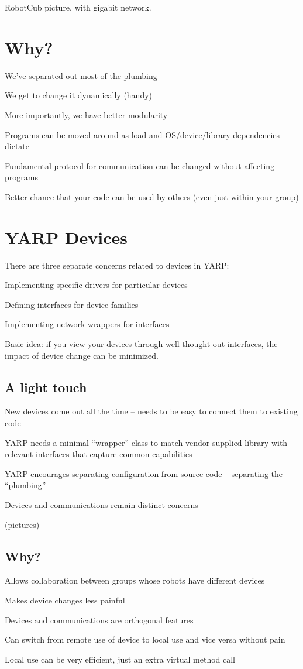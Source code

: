 RobotCub picture, with gigabit network.

\section{Why?}

We've separated out most of the plumbing

We get to change it dynamically (handy)

More importantly, we have better modularity

Programs can be moved around as load and OS/device/library
 dependencies dictate

Fundamental protocol for communication can be changed without 
affecting programs

Better chance that your code can be used by others (even just within 
your group)


\section{YARP Devices}

There are three separate concerns related to devices in YARP:

Implementing specific drivers for particular devices 

Defining interfaces for device families 

Implementing network wrappers for interfaces

Basic idea: if you view your devices through well thought out
interfaces, the impact of device change can be minimized.


\subsection{A light touch}

New devices come out all the time -- needs to be easy to connect them
to existing code

YARP needs a minimal ``wrapper'' class to match vendor-supplied
library with relevant interfaces that capture common capabilities

YARP encourages separating configuration from source code -- separating
the ``plumbing''

Devices and communications remain distinct concerns

(pictures)


\subsection{Why?}

Allows collaboration between groups whose robots have different devices

Makes device changes less painful

Devices and communications are orthogonal features

Can switch from remote use of device to local use and vice versa without pain

Local use can be very efficient, just an extra virtual method call

